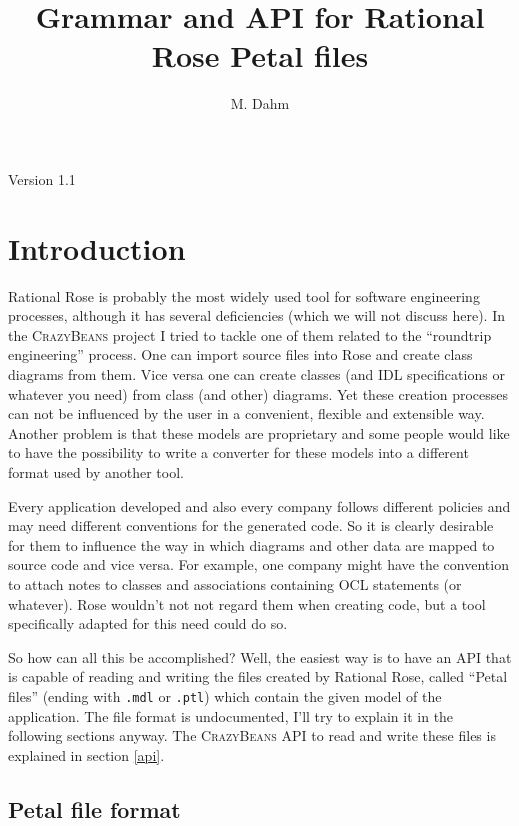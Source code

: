 \documentclass{article}
\title{Grammar and API for Rational Rose Petal files}
\author{M. Dahm}
\begin{document}
\maketitle

\begin{center}
  Version 1.1
\end{center}

\section{Introduction}

Rational Rose \cite{rose} is probably the most widely used tool for
software engineering processes, although it has several deficiencies
(which we will not discuss here). In the \textsc{CrazyBeans} project I
tried to tackle one of them related to the ``roundtrip engineering''
process.  One can import source files into Rose and create class
diagrams from them. Vice versa one can create classes (and IDL
specifications or whatever you need) from class (and other) diagrams.
Yet these creation processes can not be influenced by the user in a
convenient, flexible and extensible way. Another problem is that these
models are proprietary and some people would like to have the
possibility to write a converter for these models into a different
format used by another tool.

Every application developed and also every company follows different
policies and may need different conventions for the generated code. So
it is clearly desirable for them to influence the way in which
diagrams and other data are mapped to source code and vice versa. For
example, one company might have the convention to attach notes to
classes and associations containing OCL \cite{ocl} statements (or
whatever). Rose wouldn't not not regard them when creating code, but a
tool specifically adapted for this need could do so.

So how can all this be accomplished? Well, the easiest way is to have an
API that is capable of reading and writing the files created by
Rational Rose, called ``Petal files'' (ending with \texttt{.mdl} or
\texttt{.ptl}) which contain the given model of the application. The
file format is undocumented, I'll try to explain it in the following
sections anyway. The \textsc{CrazyBeans} API to read and write these
files is explained in section \ref{api}.

\subsection{Petal file format}
\end{document}
